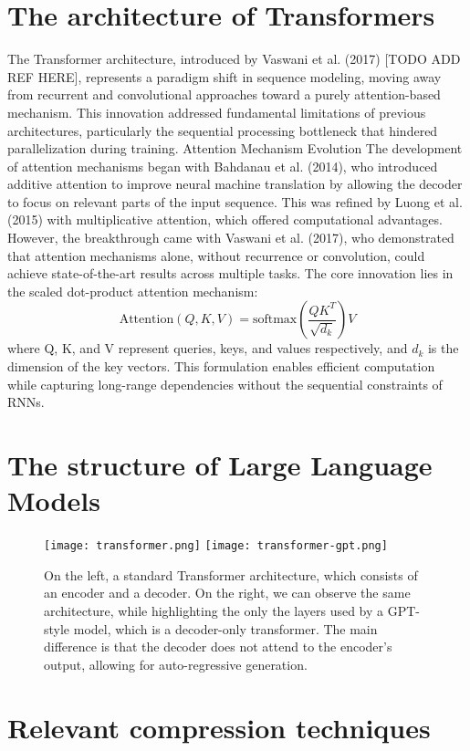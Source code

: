 \section{The architecture of Transformers}
The Transformer architecture, introduced by Vaswani et al. (2017) [TODO ADD REF HERE], represents a paradigm shift in sequence modeling, moving away from recurrent and convolutional approaches toward a purely attention-based mechanism. This innovation addressed fundamental limitations of previous architectures, particularly the sequential processing bottleneck that hindered parallelization during training.
Attention Mechanism Evolution
The development of attention mechanisms began with Bahdanau et al. (2014), who introduced additive attention to improve neural machine translation by allowing the decoder to focus on relevant parts of the input sequence. This was refined by Luong et al. (2015) with multiplicative attention, which offered computational advantages. However, the breakthrough came with Vaswani et al. (2017), who demonstrated that attention mechanisms alone, without recurrence or convolution, could achieve state-of-the-art results across multiple tasks.
The core innovation lies in the scaled dot-product attention mechanism:
\begin{equation}
\text{Attention}(Q, K, V) = \text{softmax}\left(\frac{QK^T}{\sqrt{d_k}}\right)V
\end{equation}
where Q, K, and V represent queries, keys, and values respectively, and $d_{k}$ is the dimension of the key vectors. This formulation enables efficient computation while capturing long-range dependencies without the sequential constraints of RNNs.

\section{The structure of Large Language Models}

\begin{figure}[htbp]
    \centering
    \texttt{[image: transformer.png]}
    \hfill
    \texttt{[image: transformer-gpt.png]}
    \caption{On the left, a standard Transformer architecture, which consists of an encoder and a decoder. On the right, we can observe the same architecture, while highlighting the only the layers used by a GPT-style model, which is a decoder-only transformer. The main difference is that the decoder does not attend to the encoder's output, allowing for auto-regressive generation.}
    \label{fig:sidebyside}
\end{figure}

\section{Relevant compression techniques}



